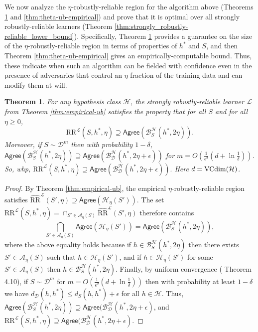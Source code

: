 \documentclass[11pt]{article}
\newcommand{\CR}{\text{RR}}
\newcommand{\ECR}{\widehat{\text{RR}}}
\newtheorem{theorem}{Theorem}[section]
\newcommand{\0}{\mathbf{0}}
\newcommand{\1}{\mathbf{1}}
\newcommand{\cA}{\mathcal{A}}
\newcommand{\cB}{\mathcal{B}}
\newcommand{\cD}{\mathcal{D}}
\newcommand{\cH}{\mathcal{H}}
\newcommand{\cL}{\mathcal{L}}
\newcommand{\Agree}{\mathsf{Agree}}
\begin{document}
We now analyze the $\eta$-robustly-reliable region for the algorithm above (Theorems \ref{thm:theta-ub} and \ref{thm:theta-ub-empirical}) and prove that it is optimal over all strongly robustly-reliable learners (Theorem \ref{thm:strongly_robustly-reliable_lower_bound}).
Specifically,
Theorem \ref{thm:theta-ub} provides a guarantee on the size of the $\eta$-robustly-reliable region in terms of properties of $h^*$ and $S$, and then Theorem \ref{thm:theta-ub-empirical} gives an empirically-computable bound.  Thus, these indicate when such an algorithm can be fielded with confidence even in the presence of adversaries that control an $\eta$ fraction of the training data and can modify them at will.

\begin{theorem}\label{thm:theta-ub}
For any hypothesis class $\cH$, the strongly robustly-reliable learner $\cL$ from Theorem \ref{thm:empirical-ub} satisfies the property that for all $S$ and for all $\eta\geq 0$,
$$\CR^\cL(S,h^*,\eta) \supseteq \Agree\left(\cB_S^\cH(h^*,2\eta)\right).$$
Moreover, if  $S\sim \cD^m$ then with probability $1-\delta$, $\Agree(\cB_S^\cH(h^*,2\eta)) \supseteq \Agree(\cB_\cD^\cH(h^*,2\eta+\epsilon))$ for $m=O(\frac{1}{\epsilon^2}(d+\ln\frac{1}{\delta}))$.  So, whp, $\CR^\cL(S,h^*,\eta) \supseteq \Agree(\cB_\cD^\cH(h^*,2\eta+\epsilon)).$
Here $d= {\rm VCdim}(\cH)$.

\end{theorem}


\begin{proof}
By Theorem \ref{thm:empirical-ub}, the empirical $\eta$-robustly-reliable region satisfies $\ECR^{\cL}(S',\eta) \supseteq \Agree(\cH_\eta(S'))$.
The set $\CR^\cL(S,h^*,\eta) = \cap_{S'\in\cA_\eta(S)} \ECR^\cL(S',\eta)$
therefore contains
$$\bigcap_{S' \in \cA_\eta(S)} \Agree(\cH_\eta(S')) = \Agree\left(\cB_S^\cH(h^*,2\eta)\right),$$
where the above equality holds because if $h\in \cB_S^\cH(h^*,2\eta)$ then there exists $S' \in \cA_\eta(S)$ such that $h\in \cH_\eta(S')$, and if $h\in \cH_\eta(S')$ for some $S' \in \cA_\eta(S)$ then $h\in \cB_S^\cH(h^*,2\eta)$.
Finally, by uniform convergence (\cite{anthony2009neural} Theorem 4.10), if $S\sim \cD^m$ for $m=O(\frac{1}{\epsilon^2}(d+\ln\frac{1}{\delta}))$ then with probability at least $1-\delta$ we have $d_\cD(h,h^*)\le d_S(h,h^*)+\epsilon$ for all $h \in \cH$.  {Thus,
$\Agree(\cB_S^\cH(h^*,2\eta)) \supseteq \Agree(\cB_\cD^\cH(h^*,2\eta+\epsilon)$, and $\CR^\cL(S,h^*,\eta) \supseteq \Agree(\cB_\cD^\cH(h^*,2\eta+\epsilon)$.}
\end{proof}
\end{document}
